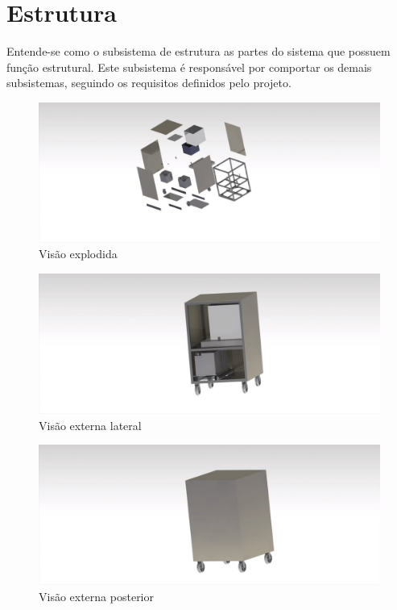 \section{Estrutura}

Entende-se como o subsistema de estrutura as partes do sistema que possuem função estrutural. Este subsistema é responsável por comportar os demais subsistemas, seguindo os requisitos definidos pelo projeto.

\begin{figure}[H]
\centering
\includegraphics[width=16cm]{figuras/visaoexplodida_estrutura.jpeg}
\caption{Visão explodida}
\end{figure}

\begin{figure}[H]
\centering
\includegraphics[width=16cm]{figuras/visaolateral_estrutura.jpeg}
\caption{Visão externa lateral}
\end{figure}

\begin{figure}[H]
\centering
\includegraphics[width=16cm]{figuras/visaoexterna_estrutura.jpeg}
\caption{Visão externa posterior}
\end{figure}

